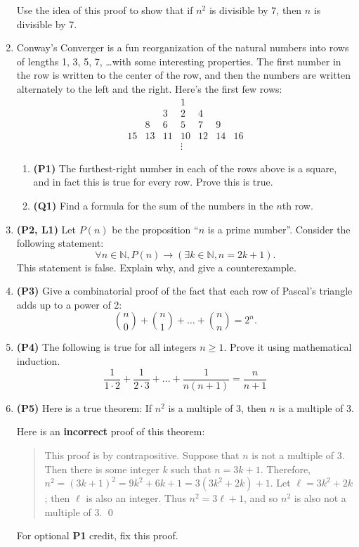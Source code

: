 \documentclass[12pt]{article}
\begin{document}
\begin{enumerate}
Use the idea of this proof to show that if $n^2$ is divisible by 7, then $n$ is divisible by 7.

\item Conway's Converger is a fun reorganization of the natural numbers into rows of lengths 1, 3, 5, 7, \ldots with some interesting properties. The first number in the row is written to the center of the row, and then the numbers are written alternately to the left and the right. Here's the first few rows:
\[
    \begin{array}{ccccccc}
   &    &    & 1  &    &    &    \\
   &    & 3  & 2  & 4  &    &    \\
   & 8  & 6  & 5  & 7  & 9  &    \\
15 & 13 & 11 & 10 & 12 & 14 & 16 \\
   &    &    & \vdots & &   &
    \end{array}
\]
\begin{enumerate}
    \item \textbf{(P1)} The furthest-right number in each of the rows above is a square, and in fact this is true for every row. Prove this is true.
    \item \textbf{(Q1)} Find a formula for the sum of the numbers in the $n$th row.
\end{enumerate}

\item \textbf{(P2, L1)} Let $P(n)$ be the proposition ``$n$ is a prime number''. Consider the following statement: 
\[ \forall n \in \mathbb{N}, P(n) \to (\exists k\in \mathbb{N}, n = 2k+1). \]
This statement is false. Explain why, and give a counterexample.

\item \textbf{(P3)} Give a combinatorial proof of the fact that each row of Pascal's triangle adds up to a power of 2:
\[\binom{n}{0} + \binom{n}{1} + \ldots + \binom{n}{n} = 2^n. \]

\item \textbf{(P4)} The following is true for all integers $n \geq 1$. Prove it using mathematical induction.
\[\frac{1}{1 \cdot 2} + \frac{1}{2 \cdot 3} + ... + \frac{1}{n(n+1)}=\frac{n}{n+1}\]

\item \textbf{(P5)} Here is a true theorem: If $n^2$ is a multiple of 3, then $n$ is a multiple of 3. 

Here is an \textbf{incorrect} proof of this theorem:
\begin{quotation}
This proof is by contrapositive. Suppose that $n$ is not a multiple of 3. Then there is some integer $k$ such that $n = 3k + 1$. Therefore, $n^2 = (3k+1)^2 = 9k^2 + 6k + 1 = 3(3k^2 + 2k) + 1$. Let $\ell = 3k^2 + 2k$; then $\ell$ is also an integer. Thus $n^2 = 3\ell + 1$, and so $n^2$ is also not a multiple of 3. \qed
\end{quotation}
For optional \textbf{P1} credit, fix this proof.



\end{enumerate}
\end{document}
